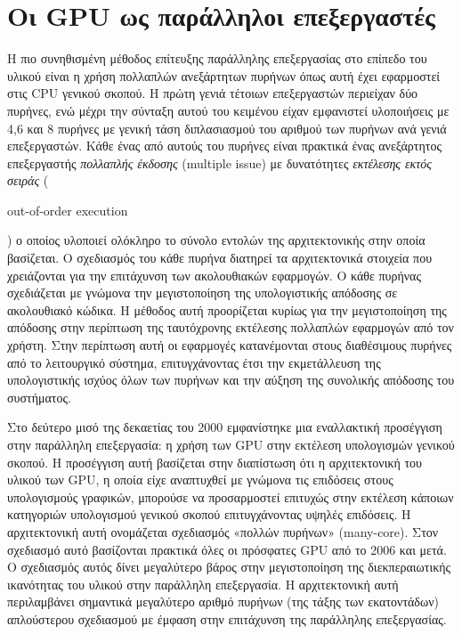 \section{Οι GPU ως παράλληλοι επεξεργαστές}
\label{chapter:gpucalc}
\noindent Η πιο συνηθισμένη μέθοδος επίτευξης παράλληλης επεξεργασίας στο επίπεδο του υλικού είναι η χρήση πολλαπλών ανεξάρτητων πυρήνων όπως αυτή έχει εφαρμοστεί στις CPU γενικού σκοπού. Η πρώτη γενιά τέτοιων επεξεργαστών περιείχαν δύο πυρήνες, ενώ μέχρι την σύνταξη αυτού του κειμένου είχαν εμφανιστεί υλοποιήσεις με 4,6 και 8 πυρήνες με γενική τάση διπλασιασμού του αριθμού των πυρήνων ανά γενιά επεξεργαστών. Κάθε ένας από αυτούς του πυρήνες είναι πρακτικά ένας ανεξάρτητος επεξεργαστής \textit{πολλαπλής έκδοσης} (multiple issue) με δυνατότητες \textit{εκτέλεσης εκτός σειράς} (\begin{english}out-of-order execution\end{english}) ο οποίος υλοποιεί ολόκληρο το σύνολο εντολών της αρχιτεκτονικής στην οποία βασίζεται. O σχεδιασμός του κάθε πυρήνα διατηρεί τα αρχιτεκτονικά στοιχεία που χρειάζονται για την επιτάχυνση των ακολουθιακών εφαρμογών. Ο κάθε πυρήνας σχεδιάζεται με γνώμονα την μεγιστοποίηση της υπολογιστικής απόδοσης σε ακολουθιακό κώδικα. Η μέθοδος αυτή προορίζεται κυρίως για την μεγιστοποίηση της απόδοσης 
στην περίπτωση της ταυτόχρονης εκτέλεσης πολλαπλών εφαρμογών από τον χρήστη. Στην περίπτωση αυτή οι εφαρμογές κατανέμονται στους διαθέσιμους πυρήνες από το λειτουργικό σύστημα, επιτυγχάνοντας έτσι την εκμετάλλευση της υπολογιστικής ισχύος όλων των πυρήνων και την αύξηση της συνολικής απόδοσης του συστήματος.

Στο δεύτερο μισό της δεκαετίας του 2000 εμφανίστηκε μια εναλλακτική προσέγγιση στην παράλληλη επεξεργασία: η χρήση των GPU στην εκτέλεση υπολογισμών γενικού σκοπού. Η προσέγγιση αυτή βασίζεται στην διαπίστωση ότι η αρχιτεκτονική του υλικού των GPU, η οποία είχε αναπτυχθεί με γνώμονα τις επιδόσεις στους υπολογισμούς γραφικών, μπορούσε να προσαρμοστεί επιτυχώς στην εκτέλεση κάποιων κατηγοριών υπολογισμού γενικού σκοπού επιτυγχάνοντας υψηλές επιδόσεις. Η αρχιτεκτονική αυτή ονομάζεται σχεδιασμός «πολλών πυρήνων» (many-core). Στον σχεδιασμό αυτό βασίζονται πρακτικά όλες οι πρόσφατες GPU από το 2006 και μετά. Ο σχεδιασμός αυτός δίνει μεγαλύτερο βάρος στην μεγιστοποίηση της διεκπεραιωτικής ικανότητας του υλικού στην παράλληλη επεξεργασία. Η αρχιτεκτονική αυτή περιλαμβάνει σημαντικά μεγαλύτερο αριθμό πυρήνων (της τάξης των εκατοντάδων) απλούστερου σχεδιασμού με έμφαση στην επιτάχυνση της παράλληλης επεξεργασίας. 

